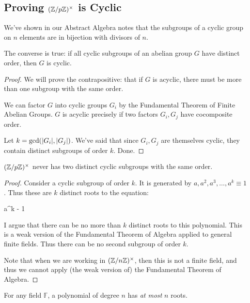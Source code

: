 \subsection{Proving $\mathopen{}\left( {\mathbb{Z} / p\mathbb{Z}} \right)\mathclose{}^\times$ is Cyclic}

\begin{lemma}
  We've shown in our Abstract Algebra notes that the subgroups of a
  cyclic group on $n$ elements are in bijection with divisors of $n$.

  The converse is true: if all cyclic subgroups of an abelian group $G$
  have distinct order, then $G$ is cyclic.
\end{lemma}

\begin{proof}
  We will prove the contrapositive: that if $G$ is acyclic, there must
  be more than one subgroup with the same order.

  We can factor $G$ into cyclic groups $G_i$ by the Fundamental Theorem
  of Finite Abelian Groups. $G$ is acyclic precisely if two factors
  $G_i, G_j$ have cocomposite order.

  Let $k = \gcd\mathopen{}\left( {|G_i|, |G_j|} \right)\mathclose{}$. We've said that since $G_i,
  G_j$ are themselves cyclic, they contain distinct subgroups of order
  $k$. Done.
\end{proof}

\begin{lemma}
  $\mathopen{}\left( {\mathbb{Z} / p\mathbb{Z}} \right)\mathclose{}^\times$ never has two distinct cyclic subgroups with the same order.
\end{lemma}

\begin{proof}
  Consider a cyclic subgroup of order $k$. It is generated by $a, a^2,
  a^3, \ldots, a^k \equiv 1$. Thus these are $k$ distinct roots to the
  equation:

  \begin{nedqn}
    a^k - 1
  \end{nedqn}

  I argue that there can be no more than $k$ distinct roots to this
  polynomial. This is a weak version of the Fundamental Theorem of
  Algebra applied to general finite fields. Thus there can be no second
  subgroup of order $k$.

  Note that when we are working in $\mathopen{}\left( {\mathbb{Z} / n\mathbb{Z}} \right)\mathclose{}^\times$, then this is not a finite
  field, and thus we cannot apply (the weak version of) the Fundamental
  Theorem of Algebra.
\end{proof}

\begin{lemma}
  For any field $\mathbb{F}$, a polynomial of degree $n$ has \emph{at
  most} $n$ roots.
\end{lemma}

